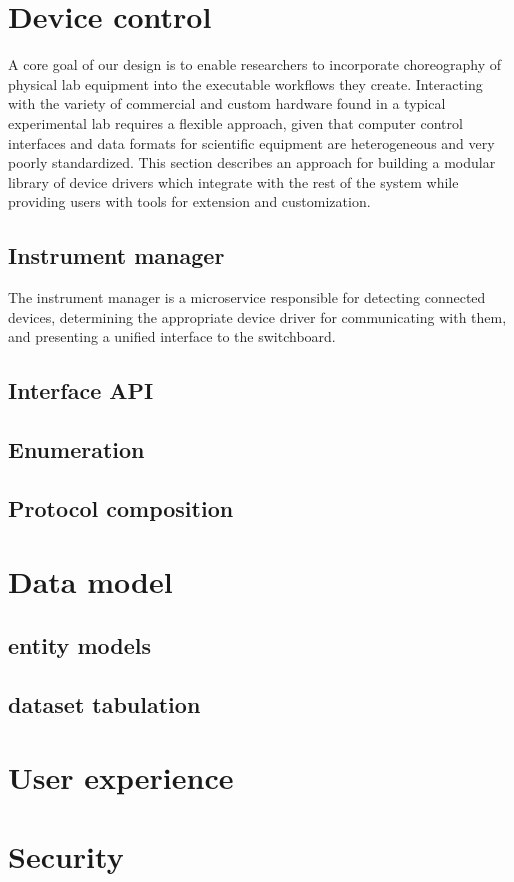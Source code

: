 \documentclass[../thesis]{subfiles}
\begin{document}
\section{Device control}
A core goal of our design is to enable researchers to incorporate
choreography of physical lab equipment into the executable workflows
they create. Interacting with the variety of commercial and custom
hardware found in a typical experimental lab requires a flexible
approach, given that computer control interfaces and data formats for
scientific equipment are heterogeneous and very poorly
standardized. This section describes an approach for building a
modular library of device drivers which integrate with the rest of the
system while providing users with tools for extension and
customization.

\subsection{Instrument manager}
The instrument manager is a microservice responsible for detecting
connected devices, determining the appropriate device driver for
communicating with them, and presenting a unified interface to the
switchboard.

\subsection{Interface API}

\subsection{Enumeration}

\subsection{Protocol composition}



\section{Data model}

\subsection{entity models}

\subsection{dataset tabulation}



\section{User experience}



\section{Security}
\end{document}
